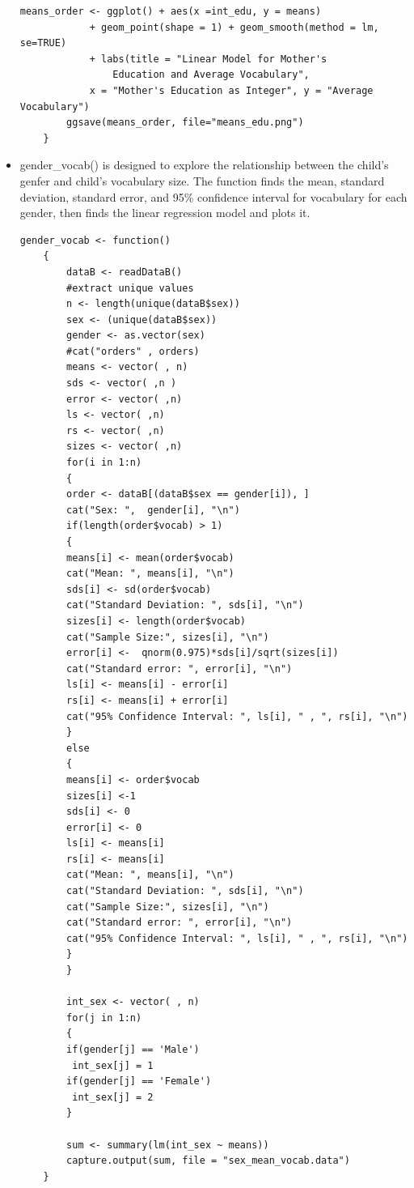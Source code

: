 \documentclass[11pt]{article}  %
\begin{document}
\begin{itemize}
\begin{lstlisting}[basicstyle=\small]
        means_order <- ggplot() + aes(x =int_edu, y = means) 
            + geom_point(shape = 1) + geom_smooth(method = lm, se=TRUE)
            + labs(title = "Linear Model for Mother's 
                Education and Average Vocabulary",
            x = "Mother's Education as Integer", y = "Average Vocabulary")
        ggsave(means_order, file="means_edu.png")
    }
    \end{lstlisting}

    \label{sec:GV}
    \item gender\_vocab() is designed to explore the relationship between the child's genfer and child's vocabulary size. The function finds the mean, standard deviation, standard error, and 95\% confidence interval for vocabulary for each gender, then finds the linear regression model and plots it.
    \begin{lstlisting}[basicstyle=\small]
    gender_vocab <- function()
    {
        dataB <- readDataB()
        #extract unique values
        n <- length(unique(dataB$sex))
        sex <- (unique(dataB$sex))
        gender <- as.vector(sex)
        #cat("orders" , orders)
        means <- vector( , n)
        sds <- vector( ,n )
        error <- vector( ,n)
        ls <- vector( ,n)
        rs <- vector( ,n)
        sizes <- vector( ,n)
        for(i in 1:n)
        {
        order <- dataB[(dataB$sex == gender[i]), ]
        cat("Sex: ",  gender[i], "\n")
        if(length(order$vocab) > 1)
        {
        means[i] <- mean(order$vocab)
        cat("Mean: ", means[i], "\n")
        sds[i] <- sd(order$vocab)
        cat("Standard Deviation: ", sds[i], "\n")
        sizes[i] <- length(order$vocab)
        cat("Sample Size:", sizes[i], "\n")
        error[i] <-  qnorm(0.975)*sds[i]/sqrt(sizes[i])
        cat("Standard error: ", error[i], "\n")
        ls[i] <- means[i] - error[i]
        rs[i] <- means[i] + error[i]
        cat("95% Confidence Interval: ", ls[i], " , ", rs[i], "\n")
        }
        else
        {
        means[i] <- order$vocab
        sizes[i] <-1
        sds[i] <- 0
        error[i] <- 0
        ls[i] <- means[i]
        rs[i] <- means[i]
        cat("Mean: ", means[i], "\n")
        cat("Standard Deviation: ", sds[i], "\n")
        cat("Sample Size:", sizes[i], "\n")
        cat("Standard error: ", error[i], "\n")
        cat("95% Confidence Interval: ", ls[i], " , ", rs[i], "\n")
        }
        }
        
        int_sex <- vector( , n)
        for(j in 1:n)
        {
        if(gender[j] == 'Male')
         int_sex[j] = 1
        if(gender[j] == 'Female')
         int_sex[j] = 2
        }
        
        sum <- summary(lm(int_sex ~ means))
        capture.output(sum, file = "sex_mean_vocab.data")
    }
    \end{lstlisting}

\end{itemize}
    
\end{document}
